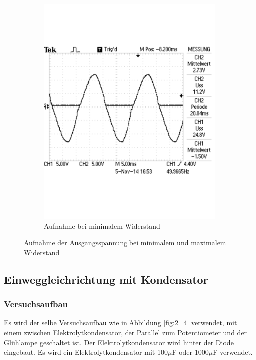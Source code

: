 \documentclass[12pt,a4paper]{article}
\begin{document}
\begin{figure}[H]
\begin{subfigure}[b]{0.48\textwidth}
                \includegraphics[width=\textwidth , scale = 0.4]{2_3_2.pdf}
                \caption[Aufnahme bei minimalem Widerstand]{Aufnahme bei minimalem Widerstand}
  				\label{fig:2_3_2}
        \end{subfigure}
        \caption{Aufnahme der Ausgangsspannung bei minimalem und maximalem Widerstand}
        \label{fig:2_3}
\end{figure}


\subsection{Einweggleichrichtung mit Kondensator}
\subsubsection{Versuchsaufbau}
Es wird der selbe Versuchsaufbau wie in Abbildung \ref{fig:2_4} verwendet, mit einem zwischen Elektrolytkondensator, der Parallel zum Potentiometer und der Glühlampe geschaltet ist. Der Elektrolytkondensator wird hinter der Diode eingebaut. Es wird ein Elektrolytkondensator mit 100$\mu$F oder 1000$\mu$F verwendet.
\end{document}
